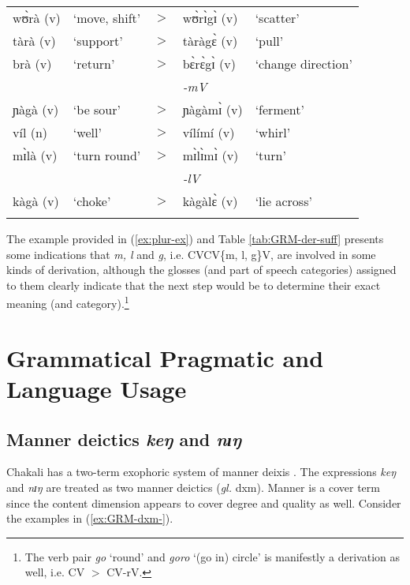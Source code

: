 \begin{exe}
\begin{exe}
\begin{exe}
{\begin{exe}
\begin{exe}
\begin{exe}
\begin{exe}
\begin{exe}
\begin{exe}
\begin{exe}
\begin{xlist}
\begin{exe}
\begin{exe}
\begin{exe}
\begin{exe}
\begin{exe}
\begin{exe}
\begin{exe}
\begin{exe}
\begin{exe}
\begin{exe}
\begin{exe}
\begin{exe}
\begin{exe}
\begin{exe}
\begin{exe}
\begin{table}[!htb]
\begin{tabular}{lllll}
wʊ̀rà {(v)}& `move, shift' & $>$ & wʊ̀rɪ̀gɪ̀ {(v)}& `scatter'\\
tàrà  {(v)}& `support' & $>$ &tàràgɛ̀ {(v)}& `pull' \\
brà {(v)}& `return' & $>$ & bɛ̀rɛ̀gɪ̀  {(v)}& `change direction'\\\midrule

&&&{\it -mV} &\\\midrule

ɲàgà  {(v)} & `be sour' &$>$ & ɲàgàmɪ̀  {(v)}& `ferment' \\
víl {(n)} &`well' & $>$ &vílímí {(v)} & `whirl' \\
 mɪ̀là {(v)} & `turn round' & $>$ &mɪ̀lɪ̀mɪ̀ {(v)}& `turn'\\[1ex]\midrule

&&&{\it -lV}&\\\midrule
 kàgà {(v)}& `choke'& $>$ & kàgàlɛ̀ {(v)} & `lie across' \\
 \lspbottomrule
\end{tabular}
\end{table}


The  example  provided in (\ref{ex:plur-ex}) and Table \ref{tab:GRM-der-suff} 
presents  some indications that {\it m, l} and {\it g}, i.e. CVCV\{m, l, g\}V, 
are involved in some kinds of derivation, although the glosses (and part of 
speech categories) assigned to them clearly indicate that the next step would be 
to determine their exact meaning (and category).\footnote{The verb pair {\it go} 
`round'  and {\it goro}  `(go in) circle'  is  manifestly a derivation as well, 
i.e. CV $>$ CV-rV.}


\section{Grammatical Pragmatic and Language Usage}
\label{sec:GRM-adjuncts}


\subsection{Manner deictics {\it keŋ} and {\it nɪŋ}}
\label{sec:GRM-adv-pro}

Chakali has a two-term exophoric system of manner deixis \citep{koen12}. 
The expressions  {\it keŋ} and {\it nɪŋ} are treated as  two manner deictics  
({\it gl.} {\sc dxm}).  Manner is a cover term since the content dimension 
appears to cover degree and  quality as well. Consider the 
examples in (\ref{ex:GRM-dxm-}).


\end{exe}
\end{exe}
\end{exe}
\end{exe}
\end{exe}
\end{exe}
\end{exe}
\end{exe}
\end{exe}
\end{exe}
\end{exe}
\end{exe}
\end{exe}
\end{exe}
\end{exe}
\end{xlist}
\end{exe}
\end{exe}
\end{exe}
\end{exe}
\end{exe}
\end{exe}
\end{exe}}
\end{exe}
\end{exe}
\end{exe}
